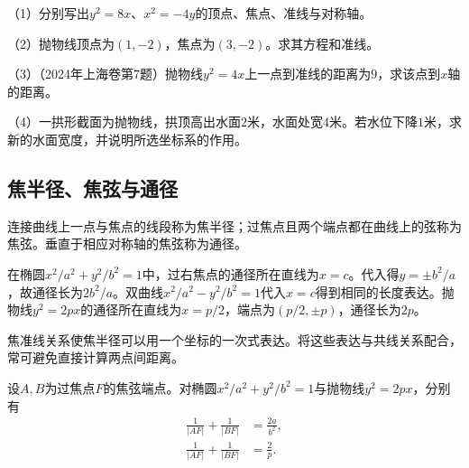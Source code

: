 \begin{exercise}
\mbox{}\par\nobreak

\begin{samepage}
（1）分别写出\(y^2=8x\)、\(x^2=-4y\)的顶点、焦点、准线与对称轴。
\par
\end{samepage}

\begin{samepage}
（2）抛物线顶点为\((1,-2)\)，焦点为\((3,-2)\)。求其方程和准线。
\par
\end{samepage}

\begin{samepage}
（3）（2024年上海卷第7题）抛物线\(y^2=4x\)上一点到准线的距离为\(9\)，求该点到\(x\)轴的距离。
\par
\end{samepage}

\begin{samepage}
（4）一拱形截面为抛物线，拱顶高出水面\(2\)米，水面处宽\(4\)米。若水位下降\(1\)米，求新的水面宽度，并说明所选坐标系的作用。
\par
\end{samepage}
\end{exercise}

\subsection{焦半径、焦弦与通径}
\label{subsec:quadratic-focal-chords}

连接曲线上一点与焦点的线段称为{\heiti{}焦半径}；过焦点且两个端点都在曲线上的弦称为{\heiti{}焦弦}。垂直于相应对称轴的焦弦称为{\heiti{}通径}。

在椭圆\(x^2/a^2+y^2/b^2=1\)中，过右焦点的通径所在直线为\(x=c\)。代入得\(y=\pm b^2/a\)，故通径长为\(2b^2/a\)。双曲线\(x^2/a^2-y^2/b^2=1\)代入\(x=c\)得到相同的长度表达。抛物线\(y^2=2px\)的通径所在直线为\(x=p/2\)，端点为\((p/2,\pm p)\)，通径长为\(2p\)。

焦准线关系使焦半径可以用一个坐标的一次式表达。将这些表达与共线关系配合，常可避免直接计算两点间距离。

\begin{samepage}
\begin{proposition}\label{prop:quadratic-focal-chord-reciprocals}
设\(A,B\)为过焦点\(F\)的焦弦端点。对椭圆\(x^2/a^2+y^2/b^2=1\)与抛物线\(y^2=2px\)，分别有
\begin{align}
    \frac1{|AF|}+\frac1{|BF|}&=\frac{2a}{b^2} ,\label{eq:quadratic-ellipse-focal-reciprocals}\\
    \frac1{|AF|}+\frac1{|BF|}&=\frac2p .\label{eq:quadratic-parabola-focal-reciprocals}
\end{align}
\end{proposition}
\end{samepage}

